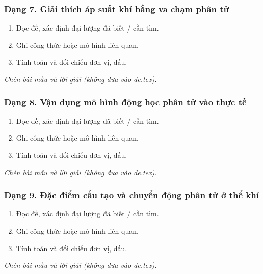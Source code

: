 \subsubsection{Dạng 7. Giải thích áp suất khí bằng va chạm phân tử}
\begin{phuongphap}
\begin{enumerate}
\item Đọc đề, xác định đại lượng đã biết / cần tìm.
\item Ghi công thức hoặc mô hình liên quan.
\item Tính toán và đối chiếu đơn vị, dấu.
\end{enumerate}
\end{phuongphap}
\begin{vidumau}
\textit{Chèn bài mẫu và lời giải (không đưa vào de.tex).}
\end{vidumau}

\subsubsection{Dạng 8. Vận dụng mô hình động học phân tử vào thực tế}
\begin{phuongphap}
\begin{enumerate}
\item Đọc đề, xác định đại lượng đã biết / cần tìm.
\item Ghi công thức hoặc mô hình liên quan.
\item Tính toán và đối chiếu đơn vị, dấu.
\end{enumerate}
\end{phuongphap}
\begin{vidumau}
\textit{Chèn bài mẫu và lời giải (không đưa vào de.tex).}
\end{vidumau}

\subsubsection{Dạng 9. Đặc điểm cấu tạo và chuyển động phân tử ở thể khí}
\begin{phuongphap}
\begin{enumerate}
\item Đọc đề, xác định đại lượng đã biết / cần tìm.
\item Ghi công thức hoặc mô hình liên quan.
\item Tính toán và đối chiếu đơn vị, dấu.
\end{enumerate}
\end{phuongphap}
\begin{vidumau}
\textit{Chèn bài mẫu và lời giải (không đưa vào de.tex).}
\end{vidumau}

